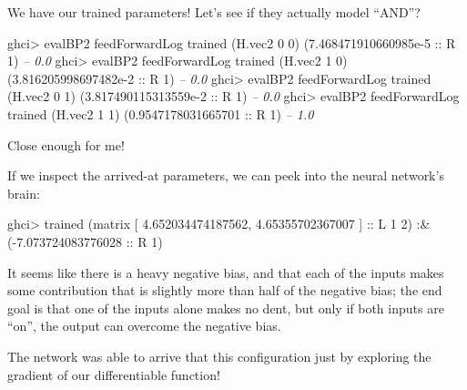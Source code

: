 \documentclass[]{article}
\newenvironment{Shaded}{}{}
\newcommand{\CommentTok}[1]{\textcolor[rgb]{0.38,0.63,0.69}{\textit{#1}}}
\newcommand{\DataTypeTok}[1]{\textcolor[rgb]{0.56,0.13,0.00}{#1}}
\newcommand{\DecValTok}[1]{\textcolor[rgb]{0.25,0.63,0.44}{#1}}
\newcommand{\FloatTok}[1]{\textcolor[rgb]{0.25,0.63,0.44}{#1}}
\newcommand{\FunctionTok}[1]{\textcolor[rgb]{0.02,0.16,0.49}{#1}}
\newcommand{\NormalTok}[1]{#1}
\newcommand{\OtherTok}[1]{\textcolor[rgb]{0.00,0.44,0.13}{#1}}
\begin{document}
We have our trained parameters! Let's see if they actually model ``AND''?

\begin{Shaded}
\begin{Highlighting}[]
\NormalTok{ghci}\FunctionTok{>}\NormalTok{ evalBP2 feedForwardLog trained (H.vec2 }\DecValTok{0} \DecValTok{0}\NormalTok{)}
\NormalTok{(}\FloatTok{7.468471910660985e-5}\OtherTok{ ::} \DataTypeTok{R} \DecValTok{1}\NormalTok{)       }\CommentTok{-- 0.0}
\NormalTok{ghci}\FunctionTok{>}\NormalTok{ evalBP2 feedForwardLog trained (H.vec2 }\DecValTok{1} \DecValTok{0}\NormalTok{)}
\NormalTok{(}\FloatTok{3.816205998697482e-2}\OtherTok{ ::} \DataTypeTok{R} \DecValTok{1}\NormalTok{)       }\CommentTok{-- 0.0}
\NormalTok{ghci}\FunctionTok{>}\NormalTok{ evalBP2 feedForwardLog trained (H.vec2 }\DecValTok{0} \DecValTok{1}\NormalTok{)}
\NormalTok{(}\FloatTok{3.817490115313559e-2}\OtherTok{ ::} \DataTypeTok{R} \DecValTok{1}\NormalTok{)       }\CommentTok{-- 0.0}
\NormalTok{ghci}\FunctionTok{>}\NormalTok{ evalBP2 feedForwardLog trained (H.vec2 }\DecValTok{1} \DecValTok{1}\NormalTok{)}
\NormalTok{(}\FloatTok{0.9547178031665701}\OtherTok{ ::} \DataTypeTok{R} \DecValTok{1}\NormalTok{)         }\CommentTok{-- 1.0}
\end{Highlighting}
\end{Shaded}

Close enough for me!

If we inspect the arrived-at parameters, we can peek into the neural network's
brain:

\begin{Shaded}
\begin{Highlighting}[]
\NormalTok{ghci}\FunctionTok{>}\NormalTok{ trained}
\NormalTok{(matrix}
\NormalTok{ [ }\FloatTok{4.652034474187562}\NormalTok{, }\FloatTok{4.65355702367007}\NormalTok{ ]}\OtherTok{ ::} \DataTypeTok{L} \DecValTok{1} \DecValTok{2}\NormalTok{) }\FunctionTok{:&}\NormalTok{ (}\FunctionTok{-}\FloatTok{7.073724083776028}\OtherTok{ ::} \DataTypeTok{R} \DecValTok{1}\NormalTok{)}
\end{Highlighting}
\end{Shaded}

It seems like there is a heavy negative bias, and that each of the inputs makes
some contribution that is slightly more than half of the negative bias; the end
goal is that one of the inputs alone makes no dent, but only if both inputs are
``on'', the output can overcome the negative bias.

The network was able to arrive that this configuration just by exploring the
gradient of our differentiable function!
\end{document}

